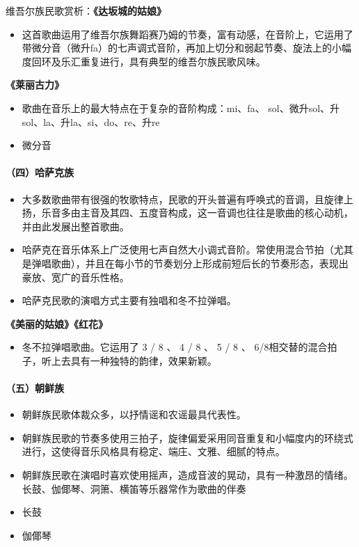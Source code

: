 \documentclass[
]{article}
\providecommand{\tightlist}{%
  \setlength{\itemsep}{0pt}\setlength{\parskip}{0pt}}
\begin{document}
维吾尔族民歌赏析：\textbf{《达坂城的姑娘》}

\begin{itemize}
\tightlist
\item
  这首歌曲运用了维吾尔族舞蹈赛乃姆的节奏，富有动感，在音阶上，它运用了带微分音（微升fa）的七声调式音阶，再加上切分和弱起节奏、旋法上的小幅度回环及乐汇重复进行，具有典型的维吾尔族民歌风味。
\end{itemize}

\textbf{《莱丽古力》}

\begin{itemize}
\tightlist
\item
  歌曲在音乐上的最大特点在于复杂的音阶构成：mi、fa、
  sol、微升sol、升sol、la、升la、si、do、re、升re
\item
  微分音
\end{itemize}

\paragraph{（四）哈萨克族}\label{ux56dbux54c8ux8428ux514bux65cf}

\begin{itemize}
\tightlist
\item
  大多数歌曲带有很强的牧歌特点，民歌的开头普遍有呼唤式的音调，且旋律上扬，乐音多由主音及其四、五度音构成，这一音调也往往是歌曲的核心动机，并由此发展出整首歌曲。
\item
  哈萨克在音乐体系上广泛使用七声自然大小调式音阶。常使用混合节拍（尤其是弹唱歌曲），并且在每小节的节奏划分上形成前短后长的节奏形态，表现出豪放、宽广的音乐性格。
\item
  哈萨克民歌的演唱方式主要有独唱和冬不拉弹唱。
\end{itemize}

\textbf{《美丽的姑娘》《红花》}

\begin{itemize}
\tightlist
\item
  冬不拉弹唱歌曲。它运用了 3 / 8 、 4 / 8 、 5 / 8 、
  6/8相交替的混合拍子，听上去具有一种独特的韵律，效果新颖。
\end{itemize}

\paragraph{（五）朝鲜族}\label{ux4e94ux671dux9c9cux65cf}

\begin{itemize}
\tightlist
\item
  朝鲜族民歌体裁众多，以抒情谣和农谣最具代表性。
\item
  朝鲜族民歌的节奏多使用三拍子，旋律偏爱采用同音重复和小幅度内的环绕式进行，这使得音乐风格具有稳定、端庄、文雅、细腻的特点。
\item
  朝鲜族民歌在演唱时喜欢使用摇声，造成音波的晃动，具有一种激昂的情绪。长鼓、伽倻琴、洞箫、横笛等乐器常作为歌曲的伴奏
\item
  长鼓
\item
  伽倻琴
\end{itemize}
\end{document}
